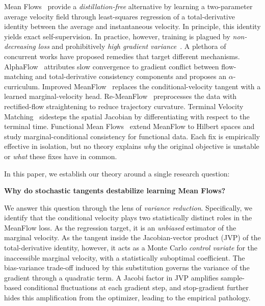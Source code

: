 Mean Flows~\cite{geng2025meanflowsonestepgenerative} provide a \emph{distillation-free} alternative by learning a two-parameter average velocity field through least-squares regression of a total-derivative identity between the average and instantaneous velocity. In principle, this identity yields exact self-supervision. In practice, however, training is plagued by \emph{non-decreasing loss} and prohibitively \emph{high gradient variance}~\cite{zhang2025alphaflowunderstandingimprovingmeanflow,geng2025improvedmeanflowschallenges}. A plethora of concurrent works have proposed remedies that target different mechanisms. AlphaFlow~\cite{zhang2025alphaflowunderstandingimprovingmeanflow} attributes slow convergence to gradient conflict between flow-matching and total-derivative consistency components and proposes an $\alpha$-curriculum. Improved MeanFlow~\cite{geng2025improvedmeanflowschallenges} replaces the conditional-velocity tangent with a learned marginal-velocity head. Re-MeanFlow~\cite{zhang2026overcomingcurvaturebottleneckmeanflow} preprocesses the data with rectified-flow straightening to reduce trajectory curvature. Terminal Velocity Matching~\cite{zhou2026terminalvelocitymatching} sidesteps the spatial Jacobian by differentiating with respect to the terminal time. Functional Mean Flows~\cite{li2025functionalmeanflowhilbert} extend MeanFlow to Hilbert spaces and study marginal-conditional consistency for functional data. Each fix is empirically effective in isolation, but no theory explains \emph{why} the original objective is unstable or \emph{what} these fixes have in common.

In this paper, we establish our theory around a single research question:
\begin{mdframed}[%
    leftline=true, linecolor=BrickRed, linewidth=2pt, topline=false,
    rightline=false, bottomline=false, backgroundcolor=dust!15
]
\noindent\textbf{Why do stochastic tangents destabilize learning Mean Flows?}
\end{mdframed}
\noindent We answer this question through the lens of \emph{variance reduction}. Specifically, we identify that the conditional velocity plays two statistically distinct roles in the MeanFlow loss. As the regression target, it is an \textit{unbiased} estimator of the marginal velocity. As the tangent inside the Jacobian-vector product (JVP) of the total-derivative identity, however, it acts as a Monte Carlo \textit{control variate} for the inaccessible marginal velocity, with a statistically suboptimal coefficient. The bias-variance trade-off induced by this substitution governs the variance of the gradient through a quadratic term. A Jacobi factor in JVP amplifies sample-based conditional fluctuations at each gradient step, and stop-gradient further hides this amplification from the optimizer, leading to the empirical pathology.


